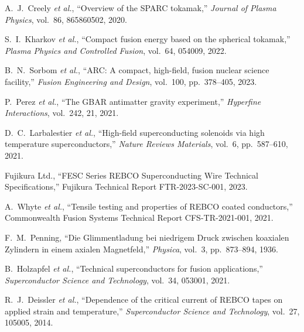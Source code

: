 \documentclass[journal]{IEEEtran}
\begin{document}
\begin{thebibliography}{25}
A.~J.~Creely \emph{et al.}, ``Overview of the SPARC tokamak,'' \emph{Journal of Plasma Physics}, vol.~86, 865860502, 2020.

S.~I.~Kharkov \emph{et al.}, ``Compact fusion energy based on the spherical tokamak,'' \emph{Plasma Physics and Controlled Fusion}, vol.~64, 054009, 2022.

B.~N.~Sorbom \emph{et al.}, ``ARC: A compact, high-field, fusion nuclear science facility,'' \emph{Fusion Engineering and Design}, vol.~100, pp.~378--405, 2023.

P.~Perez \emph{et al.}, ``The GBAR antimatter gravity experiment,'' \emph{Hyperfine Interactions}, vol.~242, 21, 2021.

D.~C.~Larbalestier \emph{et al.}, ``High-field superconducting solenoids via high temperature superconductors,'' \emph{Nature Reviews Materials}, vol.~6, pp.~587--610, 2021.

Fujikura Ltd., ``FESC Series REBCO Superconducting Wire Technical Specifications,'' Fujikura Technical Report FTR-2023-SC-001, 2023.

A.~Whyte \emph{et al.}, ``Tensile testing and properties of REBCO coated conductors,'' Commonwealth Fusion Systems Technical Report CFS-TR-2021-001, 2021.

F.~M.~Penning, ``Die Glimmentladung bei niedrigem Druck zwischen koaxialen Zylindern in einem axialen Magnetfeld,'' \emph{Physica}, vol.~3, pp.~873--894, 1936.

B.~Holzapfel \emph{et al.}, ``Technical superconductors for fusion applications,'' \emph{Superconductor Science and Technology}, vol.~34, 053001, 2021.

R.~J.~Deissler \emph{et al.}, ``Dependence of the critical current of REBCO tapes on applied strain and temperature,'' \emph{Superconductor Science and Technology}, vol.~27, 105005, 2014.

\end{thebibliography}
\end{document}
